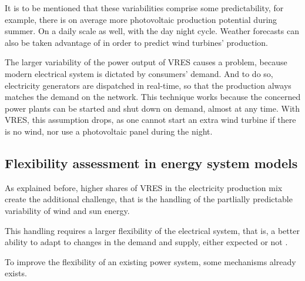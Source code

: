 It is to be mentioned that these variabilities comprise some predictability, for example, there is on average more photovoltaic production potential during summer. On a daily scale as well, with the day night cycle. Weather forecasts can also be taken advantage of in order to predict wind turbines' production.

The larger variability of the power output of VRES causes a problem, because modern electrical system is dictated by consumers' demand. And to do so, electricity generators are dispatched in real-time, so that the production always matches the demand on the network. This technique works because the concerned power plants can be started and shut down on demand, almost at any time. With VRES, this assumption drops, as one cannot start an extra wind turbine if there is no wind, nor use a photovoltaic panel during the night.

\subsection{Flexibility assessment in energy system models}

As explained before, higher shares of VRES in the electricity production mix create the additional challenge, that is the handling of the partlially predictable variability of wind and sun energy. 

This handling requires a larger flexibility of the electrical system, that is, a better ability to adapt to changes in the demand and supply, either expected or not \cite{irena}.

To improve the flexibility of an existing power system, some mechanisms already exists.

